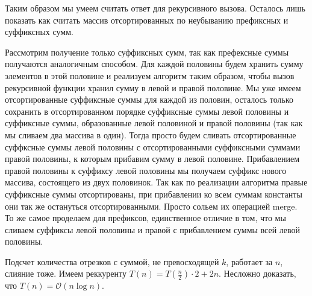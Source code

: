 \documentclass{article}
\begin{document}
Таким образом мы умеем считать ответ для рекурсивного вызова. Осталось лишь показать как считать массив отсортированных по неубыванию 
префиксных и суффиксных сумм.

Рассмотрим получение только суффиксных сумм, так как префексные суммы получаются аналогичным способом. Для каждой половины будем хранить сумму элементов в этой половине и реализуем алгоритм таким образом, чтобы вызов рекурсивной функции хранил сумму в левой и правой половине. Мы уже имеем отсортированные суффиксные суммы для каждой из половин, осталось только сохранить в отсортированном порядке суффиксные суммы левой половины и суффиксные суммы, образованные левой половиной и правой половины (так как мы сливаем два массива в один). Тогда просто будем сливать отсортированные суффксные суммы левой половины с отсортированными суффиксными суммами правой половины, к которым прибавим сумму в левой половине. Прибавлением правой половины к суффиксу левой половины мы получаем суффикс нового массива, состоящего из двух половинок. Так как по реализации алгоритма правые суффиксные суммы отсортированы, при прибавлении ко всем суммам константы они так же остануться отсортированными.  Просто сольем их операцией merge. То же самое проделаем для префиксов, единственное отличие в том, что мы сливаем суффиксы левой половины и правой с прибавлением суммы всей левой половины.

Подсчет количества отрезков с суммой, не превосходящей $k$, работает за $n$, слияние тоже. Имеем реккуренту $T(n) = T(\frac{n}{2}) \cdot 2 + 2n$. Несложно доказать, что $T(n) = \mathcal{O}(n\log{n}).$
\end{document}
